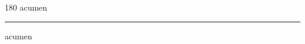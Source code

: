 
\begin{frame}
\begin{center}
\begin{turn}{180}
{\fontsize{2.5cm}{1em}\selectfont acumen}
\end{turn}
\vspace{1em}\par  
\hrule
\vspace{1em}\par  
{\fontsize{2.5cm}{1em}\selectfont acumen}
\end{center}
\end{frame}
